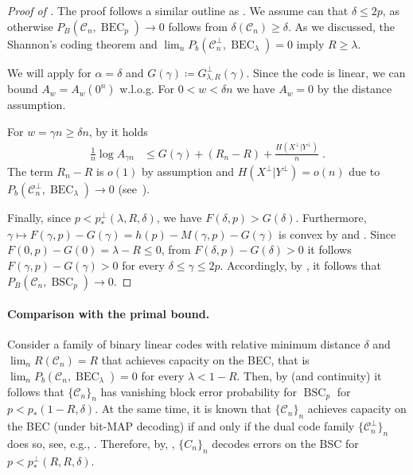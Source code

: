 \documentclass{article}
\DeclareMathOperator{\BEC}{BEC}
\DeclareMathOperator{\BSC}{BSC}
\newcommand{\cC}{\mathcal{C}}
\theoremstyle{plain}
\theoremstyle{plain}
\theoremstyle{plain}
\theoremstyle{plain}
\theoremstyle{plain}
\theoremstyle{plain}
\theoremstyle{plain}
\theoremstyle{plain}
\theoremstyle{plain}
\theoremstyle{plain}
\theoremstyle{remark}
\theoremstyle{remark}
\theoremstyle{remark}
\theoremstyle{plain}
\begin{document}
\begin{proof}[Proof of ]
    The proof follows a similar outline as . 
    We assume can that $\delta\le 2p$, as otherwise
    $P_B(\cC_n,\BEC_p)\to 0$ follows from
    $\delta(\cC_n)\ge \delta$. As we discussed,
    the Shannon's coding theorem 
    and $\lim_n P_b(\cC_n^\perp,\BEC_\lambda)=0$
    imply $R\ge\lambda$. 

    We will apply 
    for $\alpha=\delta$ and 
    $G(\gamma)\coloneqq G^\perp_{\lambda,R}(\gamma)$. Since the code is linear,
    we can bound $A_w=A_w(0^n)$ w.l.o.g.
    For $0<w<\delta n$ we have $A_w=0$
    by the distance assumption.

    For $w=\gamma n\ge\delta n$, by 
    it holds
    \begin{align*}
    \frac{1}{n}\log A_{\gamma n}
    &\le G(\gamma)+(R_n-R)+\frac{H(X^\perp|Y^\perp)}{n}\;.
    \end{align*}
    The term $R_n-R$ is $o(1)$ by assumption
    and $H(X^\perp|Y^\perp)=o(n)$ due
    to $P_b(\cC^\perp_n,\BEC_\lambda)\to 0$
    (see~).

    Finally, since
    $p<p_*^\perp(\lambda,R,\delta)$,
    we have $F(\delta,p)>G(\delta)$.
    Furthermore, 
    $\gamma\mapsto F(\gamma, p)-G(\gamma)
    =h(p)-M(\gamma,p)-G(\gamma)$
    is convex by 
    and .
    Since $F(0,p)-G(0)=\lambda-R\le 0$,
    from $F(\delta,p)-G(\delta)>0$
    it follows $F(\gamma,p)-G(\gamma)>0$
    for every $\delta\le \gamma\le 2p$.
    Accordingly, by ,
    it follows that
    $P_B(\cC_n,\BSC_p)\to 0$.
\end{proof}

\paragraph{Comparison with the primal bound.}
Consider a family of binary linear codes with 
relative minimum distance $\delta$ and
$\lim_n R(\cC_n)=R$
that achieves capacity on the BEC, that is 
$\lim_{n} P_b(\cC_n,\BEC_{\lambda})=0$ for every $\lambda<1-R$.
Then, by  (and continuity) it follows
that $\{\cC_n\}_n$ has vanishing block error probability
for $\BSC_p$ for $p<p_*(1-R,\delta)$.
At the same time, it is known that $\{\cC_n\}_n$ achieves capacity on the BEC
(under bit-MAP decoding)
if and only if the dual code family $\{\cC_n^\perp\}_n$ does so,
see, e.g., \cite[Remark 12]{kudekar2016reed}.
Therefore, by, , $\{C_n\}_n$ decodes errors
on the BSC for $p<p_*^\perp(R,R,\delta)$.
\end{document}
